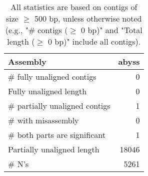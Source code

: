 \documentclass[12pt,a4paper]{article}
\begin{document}
\begin{table}[ht]
\begin{center}
\caption{All statistics are based on contigs of size $\geq$ 500 bp, unless otherwise noted (e.g., "\# contigs ($\geq$ 0 bp)" and "Total length ($\geq$ 0 bp)" include all contigs).}
\begin{tabular}{|l*{1}{|r}|}
\hline
Assembly & abyss \\ \hline
\# fully unaligned contigs & 0 \\ \hline
Fully unaligned length & 0 \\ \hline
\# partially unaligned contigs & 1 \\ \hline
\hspace{5mm}\# with misassembly & 0 \\ \hline
\hspace{5mm}\# both parts are significant & 1 \\ \hline
Partially unaligned length & 18046 \\ \hline
\# N's & 5261 \\ \hline
\end{tabular}
\end{center}
\end{table}
\end{document}
